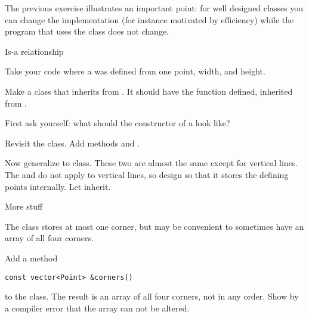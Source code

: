 The previous exercise illustrates an important point: for well
designed classes you can change the implementation (for instance motivated
by efficiency) while the program that uses the class does not change.

 {Is-a relationship}

\prerequisite{\ref{sec:inheritance}}

\begin{exercise}
  \label{ex:geom:square}
  Take your code where a  was defined from one point,
  width, and height.

  Make a class  that inherits from . It should
  have the function  defined, inherited from .

  First ask yourself: what should the constructor of a  look like?
\end{exercise}

\begin{exercise}
  \label{ex:geom:line3}
  Revisit the  class.
  Add methods  and .

  Now generalize  to 
  class. These two are almost the same except for vertical lines.
  The  and  do not apply to vertical lines, so
  design  so that it stores the defining points
  internally. Let  inherit.
\end{exercise}

 {More stuff}

\prerequisite{\ref{sec:class-ref}}

The  class stores at most one corner, but may be
convenient to sometimes have an array of all four corners.

\begin{exercise}
  \label{ex:geom:corners}
  Add a method
\begin{verbatim}
const vector<Point> &corners()
\end{verbatim}
to the  class. The result is an array of all four
corners, not in any order. Show by a compiler error that the array can
not be altered.
\end{exercise}
